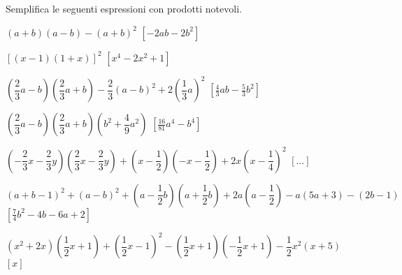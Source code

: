 \begin{esercizio}[\Ast]
 \label{ese:11.22}
Semplifica le seguenti espressioni con prodotti notevoli.

 \begin{enumeratea}
 \item \((a+b)(a-b)-(a+b)^{2}\)
  \hfill \(\left[-2{ab}-2b^{2}\right]\)
 \item \([(x-1)(1+x)]^{2}\)
  \hfill \(\left[x^{4}-2x^{2}+1\right]\)
 \item 
\(\left(\dfrac{2}{3}a-b\right)\left(\dfrac{2}{3}a+b\right)-\dfrac{2}{3}(a-b)^{2}
+2\left(\dfrac{1}{3}a\right)^{2}\)
  \hfill \(\left[\frac{4}{3}{ab}-\frac{5}{3}b^{2}\right]\)
%  
% 
%  
% 
% 
% 
 \item \(\left(\dfrac{2}{3}a-b\right)\left(\dfrac{2}{3}a+b\right)
        \left(b^{2}+\dfrac{4}{9}a^{2}\right)\)
  \hfill \(\left[\frac{16}{81}a^{4}-b^{4}\right]\)
 \item \(\left(-{\dfrac{2}{3}x-\dfrac{2}{3}y}\right)
        \left(\dfrac{2}{3}x-\dfrac{2}{3}y\right)+\left(x-\dfrac{1}{2}\right)
        \left(-x-\dfrac{1}{2}\right)+2x\left(x-\dfrac{1}{4}\right)^{2}\)
  \hfill \(\left[ \dots \right]\)
 \item \((a+b-1)^{2}+(a-b)^{2}+\left(a-\dfrac{1}{2}b\right)
        \left(a+\dfrac{1}{2}b\right)+2a\left(a-\dfrac{1}{2}\right)-
        a(5a+3)-(2b-1)\)
  \hfill \(\left[\frac{7}{4}b^{2}-4b-6a+2\right]\)
 \item \(\left(x^{2}+2x\right)
        \left(\dfrac{1}{2}x+1\right)+\left(\dfrac{1}{2}x-1\right)^{2}-
        \left(\dfrac{1}{2}x+1\right)
        \left(-{\dfrac{1}{2}}x+1\right)-\dfrac{1}{2}x^{2}(x+5)\)
  \hfill \(\left[x\right]\)
\end{enumeratea}
\end{esercizio}

